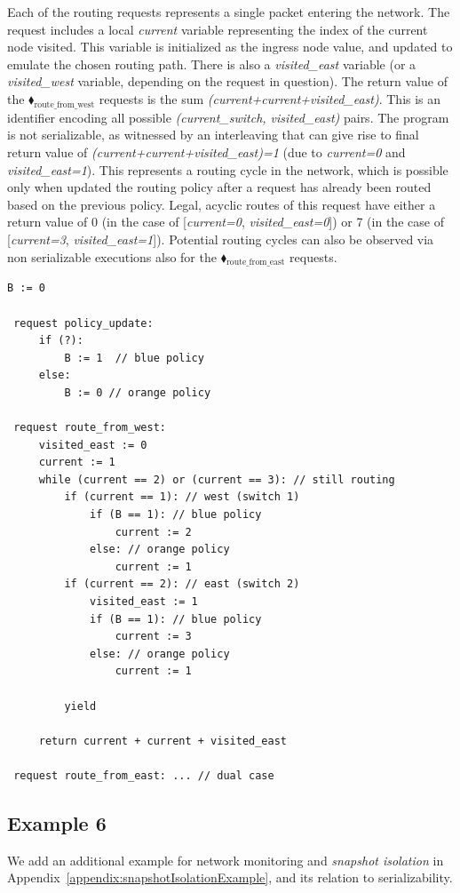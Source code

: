 
Each of the routing requests represents a single packet entering the network. The request includes a local \textit{current} variable representing the index of the current node visited. This variable is initialized as the ingress node value, and updated to emulate the chosen routing path. There is also a \textit{visited\_east} variable (or a \textit{visited\_west} variable, depending on the request in question).
%
The return value of the {\color{ForestGreen}$\blacklozenge_\text{route\_from\_west}$} requests is the sum \textit{(current+current+visited\_east)}. This is an identifier encoding all possible \textit{(current\_switch, visited\_east)} pairs.
%
The program is not serializable, as witnessed by an interleaving that can give rise to final return value of \textit{(current+current+visited\_east)=1} (due to \textit{current=0} and \textit{visited\_east=1}). This represents a routing cycle in the network, which is possible only when updated the routing policy after a request has already been routed based on the previous policy.
Legal, acyclic routes of this request have either a return value of 0 (in the case of [\textit{current=0}, \textit{visited\_east=0}]) or 7 (in the case of [\textit{current=3}, \textit{visited\_east=1}]).
Potential routing cycles can also be observed via non serializable executions also for the  {\color{ForestGreen}$\blacklozenge_\text{route\_from\_east}$} requests.



\begin{minipage}[!htbp]{0.6\textwidth}
	\begin{lstlisting}[caption={BGP (non serializable --- cycles can appear)},label={lst:BgpNonSerializable}]
 B := 0
 
 request policy_update:
     if (?):
         B := 1  // blue policy 
     else:
         B := 0 // orange policy
		
 request route_from_west:
     visited_east := 0
     current := 1
     while (current == 2) or (current == 3): // still routing        
         if (current == 1): // west (switch 1)
             if (B == 1): // blue policy
                 current := 2
             else: // orange policy
                 current := 1
         if (current == 2): // east (switch 2)
             visited_east := 1
             if (B == 1): // blue policy
                 current := 3
             else: // orange policy
                 current := 1

         yield
		
     return current + current + visited_east
     
 request route_from_east: ... // dual case      
		\end{lstlisting}
\end{minipage}






\subsection{Example 6}

We add an additional example for network monitoring and \textit{snapshot isolation} in Appendix~\ref{appendix:snapshotIsolationExample}, and its relation to serializability.



